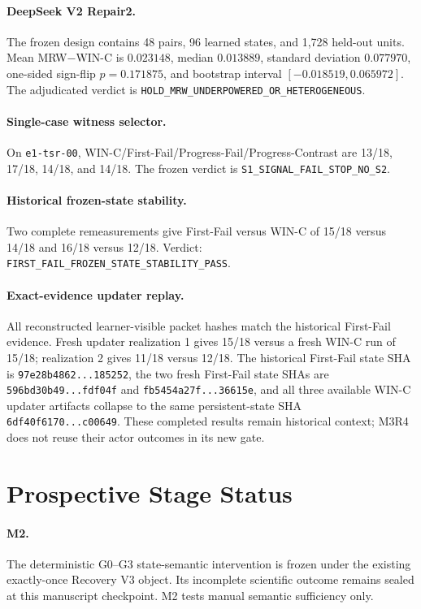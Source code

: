 \paragraph{DeepSeek V2 Repair2.}
The frozen design contains 48 pairs, 96 learned states, and 1,728 held-out units. Mean MRW$-$WIN-C is $0.023148$, median $0.013889$, standard deviation $0.077970$, one-sided sign-flip $p=0.171875$, and bootstrap interval $[-0.018519,0.065972]$. The adjudicated verdict is \texttt{HOLD\_MRW\_UNDERPOWERED\_OR\_HETEROGENEOUS}.

\paragraph{Single-case witness selector.}
On \texttt{e1-tsr-00}, WIN-C/First-Fail/Progress-Fail/Progress-Contrast are 13/18, 17/18, 14/18, and 14/18. The frozen verdict is \texttt{S1\_SIGNAL\_FAIL\_STOP\_NO\_S2}.

\paragraph{Historical frozen-state stability.}
Two complete remeasurements give First-Fail versus WIN-C of 15/18 versus 14/18 and 16/18 versus 12/18. Verdict: \texttt{FIRST\_FAIL\_FROZEN\_STATE\_STABILITY\_PASS}.

\paragraph{Exact-evidence updater replay.}
All reconstructed learner-visible packet hashes match the historical First-Fail evidence. Fresh updater realization 1 gives 15/18 versus a fresh WIN-C run of 15/18; realization 2 gives 11/18 versus 12/18. The historical First-Fail state SHA is \texttt{97e28b4862...185252}, the two fresh First-Fail state SHAs are \texttt{596bd30b49...fdf04f} and \texttt{fb5454a27f...36615e}, and all three available WIN-C updater artifacts collapse to the same persistent-state SHA \texttt{6df40f6170...c00649}. These completed results remain historical context; M3R4 does not reuse their actor outcomes in its new gate.

\section{Prospective Stage Status}
\label{app:prospective}

\paragraph{M2.}
The deterministic G0--G3 state-semantic intervention is frozen under the existing exactly-once Recovery V3 object. Its incomplete scientific outcome remains sealed at this manuscript checkpoint. M2 tests manual semantic sufficiency only.

